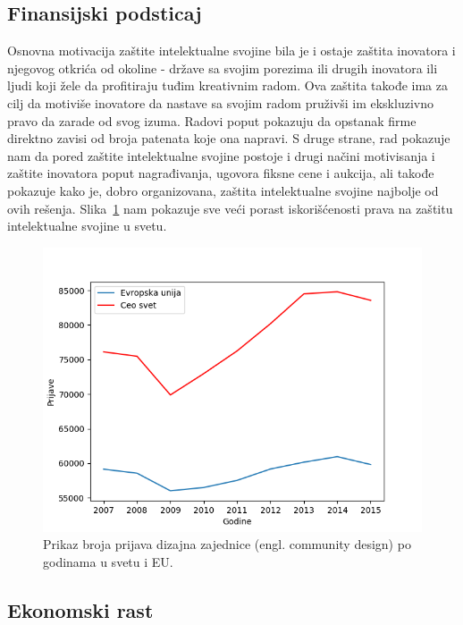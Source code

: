\documentclass[a4paper]{article}
\begin{document}
\subsection{Finansijski podsticaj}
\label{subsec:fin}

Osnovna motivacija zaštite intelektualne svojine bila je i ostaje zaštita inovatora
i njegovog otkrića od okoline - države sa svojim porezima ili drugih
inovatora ili ljudi koji žele da profitiraju tuđim kreativnim radom.
Ova zaštita takođe ima za cilj da motiviše inovatore da nastave sa svojim
radom pruživši im ekskluzivno pravo da zarade od svog izuma. Radovi poput \cite{patents} 
pokazuju da opstanak firme direktno zavisi od broja patenata koje ona napravi.
S druge strane, rad \cite{patents} pokazuje nam da pored zaštite intelektualne svojine 
postoje i drugi načini motivisanja i zaštite inovatora poput nagrađivanja, 
ugovora fiksne cene i aukcija, ali takođe pokazuje kako je, dobro
organizovana, zaštita intelektualne svojine najbolje od ovih rešenja. Slika~\ref{fig:ComDesign} nam pokazuje sve veći porast iskorišćenosti prava na zaštitu intelektualne svojine u svetu.

\newpage

\begin{figure}
\begin{center}
\includegraphics[scale=0.4615]{eu_vs_cs.png}
\end{center}
\caption{Prikaz broja prijava dizajna zajednice (engl. community design) po godinama u svetu i EU.}
\label{fig:ComDesign}
\end{figure}

\subsection{Ekonomski rast}
\label{subsec:ekon}
\end{document}
